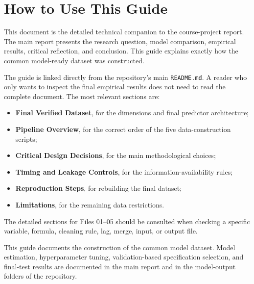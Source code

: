 \documentclass[11pt,a4paper]{article}
\newcommand{\code}[1]{\texttt{#1}}
\begin{document}

\tableofcontents
\newpage

\hypersetup{pageanchor=true}


\section*{How to Use This Guide}

This document is the detailed technical companion to the course-project report.
The main report presents the research question, model comparison, empirical
results, critical reflection, and conclusion. This guide explains exactly how
the common model-ready dataset was constructed.

The guide is linked directly from the repository's main \code{README.md}. A
reader who only wants to inspect the final empirical results does not need to
read the complete document. The most relevant sections are:

\begin{itemize}
  \item \textbf{Final Verified Dataset}, for the dimensions and final predictor
        architecture;
  \item \textbf{Pipeline Overview}, for the correct order of the five
        data-construction scripts;
  \item \textbf{Critical Design Decisions}, for the main methodological choices;
  \item \textbf{Timing and Leakage Controls}, for the information-availability
        rules;
  \item \textbf{Reproduction Steps}, for rebuilding the final dataset;
  \item \textbf{Limitations}, for the remaining data restrictions.
\end{itemize}

The detailed sections for Files 01--05 should be consulted when checking a
specific variable, formula, cleaning rule, lag, merge, input, or output file.

This guide documents the construction of the common model dataset. Model
estimation, hyperparameter tuning, validation-based specification selection,
and final-test results are documented in the main report and in the model-output
folders of the repository.
\end{document}
